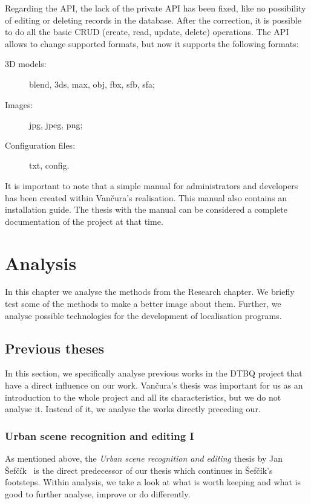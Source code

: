 \documentclass[thesis=B,english]{FITthesis}[2019/12/23]
\begin{document}
            Regarding the API, the lack of the private API has been fixed, like no possibility of editing or deleting records in the database. After the correction, it is possible to do all the basic CRUD (create, read, update, delete) operations. The API allows to change supported formats, but now it supports the following formats:  
            \begin{description}
                \item[3D models:] blend, 3ds, max, obj, fbx, sfb, sfa;
                \item[Images:] jpg, jpeg, png;
                \item[Configuration files:] txt, config.
            \end{description}
            It is important to note that a simple manual for administrators and developers has been created within Vančura's realisation. This manual also contains an installation guide. The thesis with the manual can be considered a complete documentation of the project at that time.

\chapter{Analysis}
    In this chapter we analyse the methods from the Research chapter. We briefly test some of the methods to make a better image about them. Further, we analyse possible technologies for the development of localisation programs.

        \section{Previous theses}
            In this section, we specifically analyse previous works in the DTBQ project that have a direct influence on our work. Vančura's thesis was important for us as an introduction to the whole project and all its characteristics, but we do not analyse it. Instead of it, we analyse the works directly preceding our.            

            \subsection{Urban scene recognition and editing I}
                As mentioned above, the \textit{Urban scene recognition and editing} thesis by Jan Šefčík~\cite{Sefcik2020} is the direct predecessor of our thesis which continues in Šefčík's footsteps. Within analysis, we take a look at what is worth keeping and what is good to further analyse, improve or do differently.
                
\end{document}
